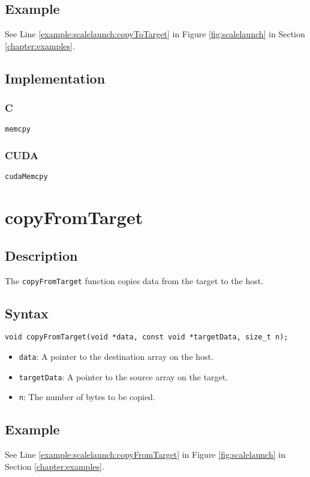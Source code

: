 \subsection{Example}
See Line \ref{example:scalelaunch:copyToTarget} in Figure \ref{fig:scalelaunch} in Section \ref{chapter:examples}.

\subsection{Implementation}
\subsubsection{C}
\verb+memcpy+
\subsubsection{CUDA}
\verb+cudaMemcpy+

\newpage
\section{copyFromTarget}

\subsection{Description}

The \verb+copyFromTarget+ function copies data from the target to the host.

\subsection{Syntax}
\begin{verbatim}
void copyFromTarget(void *data, const void *targetData, size_t n);
\end{verbatim}

\begin{itemize}
\item \verb+data+: A pointer to the destination array on the host.
\item \verb+targetData+: A pointer to the source array on the target.
\item \verb+n+: The number of bytes to be copied.
\end{itemize}


\subsection{Example}
See Line \ref{example:scalelaunch:copyFromTarget} in Figure \ref{fig:scalelaunch} in Section \ref{chapter:examples}.

